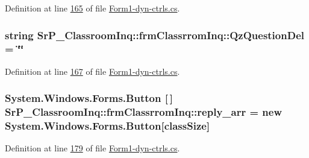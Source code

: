 \-Definition at line \hyperlink{_form1-dyn-ctrls_8cs_source_l00165}{165} of file \hyperlink{_form1-dyn-ctrls_8cs_source}{\-Form1-\/dyn-\/ctrls.\-cs}.

\hypertarget{class_sr_p___classroom_inq_1_1frm_classrrom_inq_a1fe88369748706492ccc7292a0e47331}{
\subsubsection[{\-Qz\-Question\-Del}]{\setlength{\rightskip}{0pt plus 5cm}string {\bf \-Sr\-P\-\_\-\-Classroom\-Inq\-::frm\-Classrrom\-Inq\-::\-Qz\-Question\-Del} = \char`\"{}\char`\"{}}}
\label{class_sr_p___classroom_inq_1_1frm_classrrom_inq_a1fe88369748706492ccc7292a0e47331}


\-Definition at line \hyperlink{_form1-dyn-ctrls_8cs_source_l00167}{167} of file \hyperlink{_form1-dyn-ctrls_8cs_source}{\-Form1-\/dyn-\/ctrls.\-cs}.

\hypertarget{class_sr_p___classroom_inq_1_1frm_classrrom_inq_a46ee30d934a5219840e4381a66728f0f}{
\subsubsection[{reply\-\_\-arr}]{\setlength{\rightskip}{0pt plus 5cm}\-System.\-Windows.\-Forms.\-Button \mbox{[}$\,$\mbox{]} {\bf \-Sr\-P\-\_\-\-Classroom\-Inq\-::frm\-Classrrom\-Inq\-::reply\-\_\-arr} = new \-System.\-Windows.\-Forms.\-Button\mbox{[}{\bf class\-Size}\mbox{]}}}
\label{class_sr_p___classroom_inq_1_1frm_classrrom_inq_a46ee30d934a5219840e4381a66728f0f}


\-Definition at line \hyperlink{_form1-dyn-ctrls_8cs_source_l00179}{179} of file \hyperlink{_form1-dyn-ctrls_8cs_source}{\-Form1-\/dyn-\/ctrls.\-cs}.

